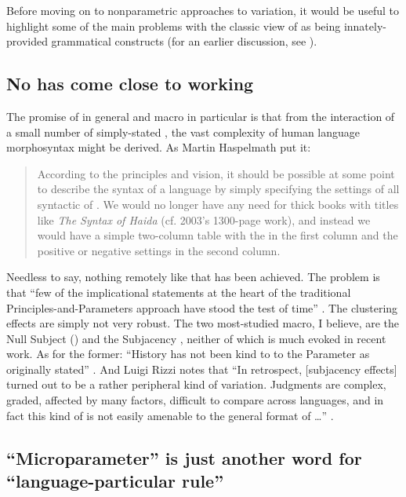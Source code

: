 \documentclass[output=paper,
modfonts
]{LSP/langsci}
\begin{document}
Before moving on to nonparametric approaches to variation, it would be
useful to highlight some of the main problems with the classic view of
 as being innately-provided grammatical constructs (for an
earlier discussion, see \citealt{newmeyer2005}).

\subsection{No  has come close to working}

The promise of  in general and macro in particular
is that from the interaction of a small number of simply-stated
, the vast complexity of human language morphosyntax might be
derived. As Martin Haspelmath put it:

\begin{quote}
According to the principles and  vision, it should be possible
at some point to describe the syntax of a language by simply specifying
the settings of all syntactic  of . We would
no longer have any need for thick books with titles like \emph{The
Syntax of Haida} (cf. \citeauthor{enrico2003} 2003's 1300-page work), and instead we
would have a simple two-column table with the  in the first
column and the positive or negative settings in the second column.
\citep[80]{haspelmath2008}
\end{quote}

Needless to say, nothing remotely like that has been achieved. The
problem is that ``few of the implicational statements at the heart of the
traditional Principles-and-Parameters approach have stood the test of
time'' \citep[216]{boeckx2011}. The clustering effects are simply not very
robust. The two most-studied macro, I believe, are the Null
Subject () and the Subjacency , neither of which is
much evoked in recent work. As for the former: ``History has not been kind to
to the  Parameter as originally stated'' \citep[352]{baker2008}. And
Luigi Rizzi notes that ``In retrospect, {[}subjacency effects{]} turned
out to be a rather peripheral kind of variation. Judgments are complex,
graded, affected by many factors, difficult to compare across languages,
and in fact this kind of  is not easily amenable to the general
format of  \ldots{}'' \citep[16]{rizzi2014}.

\subsection{``Microparameter'' is just another word for ``language-particular
rule''}\label{sec:newmeyer:6.2}
\end{document}
